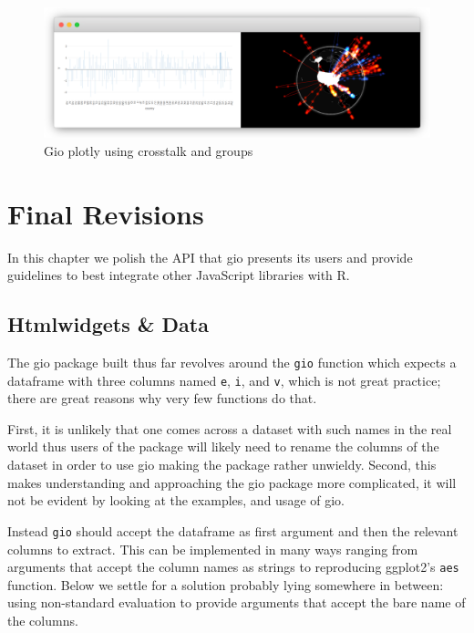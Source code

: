 \documentclass[
]{krantz}
\begin{document}
\begin{figure}
\centering
\includegraphics{images/crosstalk-gio-2.png}
\caption{Gio plotly using crosstalk and groups}
\end{figure}

\hypertarget{widgets-final}{%
\chapter{Final Revisions}\label{widgets-final}}

In this chapter we polish the API that gio presents its users and provide guidelines to best integrate other JavaScript libraries with R.

\hypertarget{widgets-final-data}{%
\section{Htmlwidgets \& Data}\label{widgets-final-data}}

The gio package built thus far revolves around the \texttt{gio} function which expects a dataframe with three columns named \texttt{e}, \texttt{i}, and \texttt{v}, which is not great practice; there are great reasons why very few functions do that.

First, it is unlikely that one comes across a dataset with such names in the real world thus users of the package will likely need to rename the columns of the dataset in order to use gio making the package rather unwieldy. Second, this makes understanding and approaching the gio package more complicated, it will not be evident by looking at the examples, and usage of gio.

Instead \texttt{gio} should accept the dataframe as first argument and then the relevant columns to extract. This can be implemented in many ways ranging from arguments that accept the column names as strings to reproducing ggplot2's \texttt{aes} function. Below we settle for a solution probably lying somewhere in between: using non-standard evaluation to provide arguments that accept the bare name of the columns.
\end{document}
